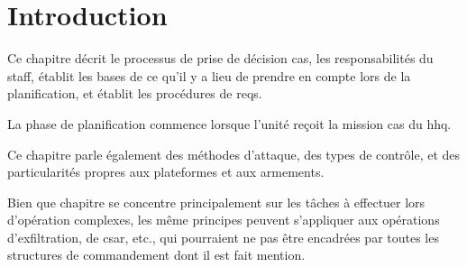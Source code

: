\section{Introduction}

Ce chapitre décrit le processus de prise de décision \gls{cas}, les responsabilités du staff, établit les bases de ce qu'il y a lieu de prendre en compte lors de la planification, et établit les procédures de \glspl{req}.

La phase de planification commence lorsque l'unité reçoit la mission \gls{cas} du \gls{hhq}.

Ce chapitre parle également des méthodes d'attaque, des types de contrôle, et des particularités propres aux plateformes et aux armements.

Bien que chapitre se concentre principalement sur les tâches à effectuer lors d'opération complexes, les même principes peuvent s'appliquer aux opérations d'exfiltration, de \gls{csar}, etc., qui pourraient ne pas être encadrées par toutes les structures de commandement dont il est fait mention.